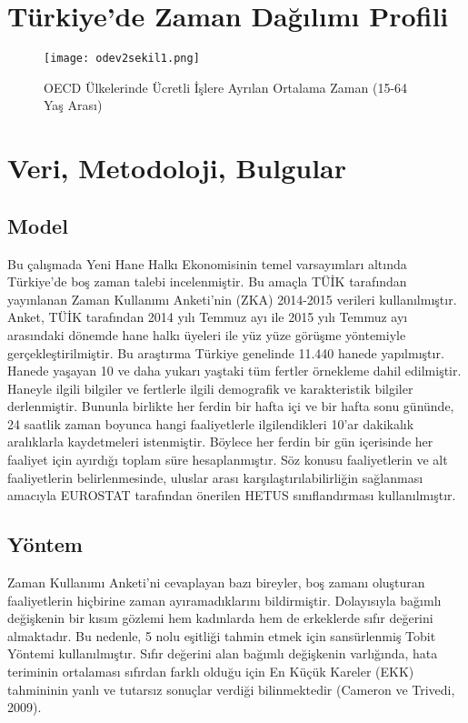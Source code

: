\documentclass[11pt]{article}
\begin{document}
	\section{Türkiye'de Zaman Dağılımı Profili}
	
	\begin{figure}
		\caption{OECD Ülkelerinde Ücretli İşlere Ayrılan Ortalama Zaman (15-64 Yaş Arası)}
		\texttt{[image: odev2sekil1.png]}
		\label{sekil1}
	\end{figure}

\section{Veri, Metodoloji, Bulgular}
\subsection{Model}

Bu çalışmada Yeni Hane Halkı Ekonomisinin temel varsayımları altında Türkiye’de boş zaman talebi incelenmiştir. Bu amaçla TÜİK tarafından yayınlanan Zaman Kullanımı Anketi’nin (ZKA) 2014-2015 verileri kullanılmıştır. Anket, TÜİK tarafından 2014 yılı Temmuz ayı ile 2015 yılı Temmuz ayı arasındaki dönemde hane halkı üyeleri ile yüz yüze görüşme yöntemiyle gerçekleştirilmiştir. Bu araştırma Türkiye genelinde 11.440 hanede yapılmıştır. Hanede yaşayan 10 ve daha yukarı yaştaki tüm fertler örnekleme dahil edilmiştir. Haneyle ilgili bilgiler ve fertlerle ilgili demografik ve karakteristik bilgiler derlenmiştir. Bununla birlikte her ferdin bir hafta içi ve bir hafta sonu gününde, 24 saatlik zaman boyunca hangi faaliyetlerle ilgilendikleri 10’ar dakikalık aralıklarla kaydetmeleri istenmiştir. Böylece her ferdin bir gün içerisinde her faaliyet için ayırdığı toplam süre hesaplanmıştır. Söz konusu faaliyetlerin ve alt faaliyetlerin belirlenmesinde, uluslar arası karşılaştırılabilirliğin sağlanması amacıyla EUROSTAT tarafından önerilen HETUS sınıflandırması kullanılmıştır. 

\subsection{Yöntem}

Zaman Kullanımı Anketi’ni cevaplayan bazı bireyler, boş zamanı oluşturan faaliyetlerin hiçbirine zaman ayıramadıklarını bildirmiştir. Dolayısıyla bağımlı değişkenin bir kısım gözlemi hem kadınlarda hem de erkeklerde sıfır değerini almaktadır. Bu nedenle, 5 nolu eşitliği tahmin etmek için sansürlenmiş Tobit Yöntemi kullanılmıştır. Sıfır değerini alan bağımlı değişkenin varlığında, hata teriminin ortalaması sıfırdan farklı olduğu için En Küçük Kareler (EKK) tahmininin yanlı ve tutarsız sonuçlar verdiği bilinmektedir (Cameron ve Trivedi, 2009).
\end{document}

